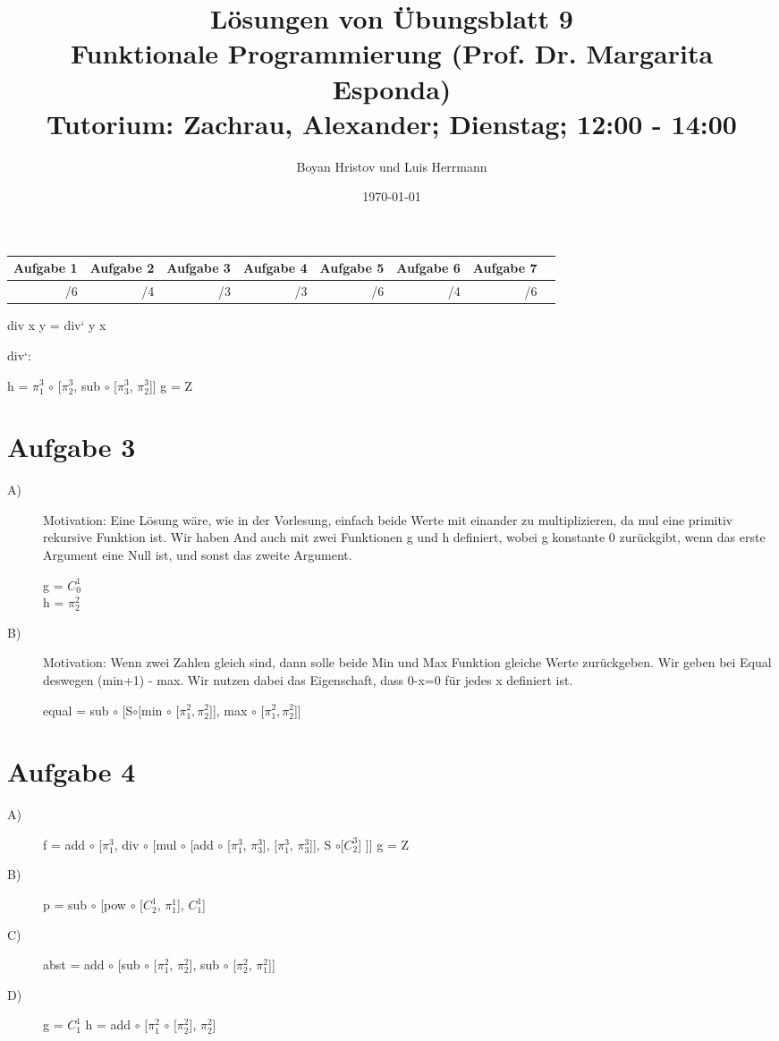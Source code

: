 \documentclass[11, 12pt]{article}
\begin{document}
\title
{
Lösungen von Übungsblatt 9 \\
Funktionale Programmierung (Prof. Dr. Margarita Esponda) \\
\normalsize Tutorium: Zachrau, Alexander; Dienstag; 12:00 - 14:00
}
\author{Boyan Hristov und Luis Herrmann}
\date{\today}
\maketitle

\begin{tabular}{|r|r|r|r|r|r|r|r}
\hline 
Aufgabe 1 & Aufgabe 2 & Aufgabe 3 & Aufgabe 4 & Aufgabe 5 & Aufgabe 6 & Aufgabe 7 \\ 
\hline 
/6 & /4 & /3 & /3 & /6 & /4 & /6\\ 
\hline 
\end{tabular}
%

div x y = div` y x

div`:

h = $\pi^3_1$ $\circ$ [$\pi^3_2$, sub $\circ$ [$\pi^3_3$, $\pi^3_2$]]
g = Z

\section*{Aufgabe 3}
\begin{description}
\item[A)]
Motivation: Eine Lösung wäre, wie in der Vorlesung, einfach beide Werte mit einander zu multiplizieren, da mul eine primitiv rekursive Funktion ist. Wir haben And auch mit zwei Funktionen g und h definiert, wobei g konstante 0 zurückgibt, wenn das erste Argument eine Null ist, und sonst das zweite Argument.

g = $C^1_0$ \\
h = $\pi^2_2$ \\

\item[B)]
Motivation: Wenn zwei Zahlen gleich sind, dann solle beide Min und Max Funktion gleiche Werte zurückgeben. Wir geben bei Equal deswegen (min+1) - max. Wir nutzen dabei das Eigenschaft, dass 0-x=0 für jedes x definiert ist.

equal = sub $\circ$ [S$\circ$[min $\circ$ [$\pi^2_1, \pi^2_2$]], max $\circ$ [$\pi^2_1, \pi^2_2$]] 

\end{description}

\section*{Aufgabe 4}
\begin{description}
\item[A)]
f = add $\circ$ [$\pi^3_1$, div $\circ$ [mul $\circ$ [add $\circ$ [$\pi^3_1$, $\pi^3_3$], [$\pi^3_1$, $\pi^3_3$]], S $\circ$[$C^3_2$] ]]
g = Z
\item[B)]
p = sub $\circ$ [pow $\circ$ [$C^1_2$, $\pi^1_1$], $C^1_1$]
\item[C)]
abst = add $\circ$ [sub $\circ$ [$\pi^2_1$, $\pi^2_2$], sub $\circ$ [$\pi^2_2$, $\pi^2_1$]]
\item[D)]
g = $C^1_1$
h = add $\circ$ [$\pi^2_1$ $\circ$ [$\pi^2_2$], $\pi^2_2$] 
\end{description}
\end{document}
